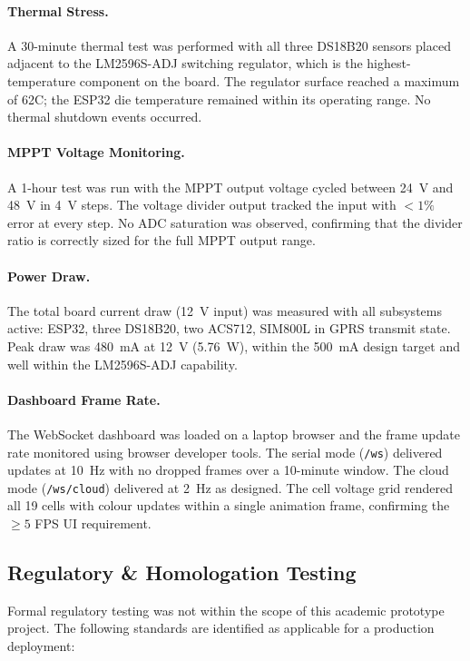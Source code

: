 \paragraph{Thermal Stress.}
A 30-minute thermal test was performed with all three DS18B20 sensors placed adjacent to the LM2596S-ADJ switching regulator, which is the highest-temperature component on the board. The regulator surface reached a maximum of 62\textdegree{}C; the ESP32 die temperature remained within its operating range. No thermal shutdown events occurred.

\paragraph{MPPT Voltage Monitoring.}
A 1-hour test was run with the MPPT output voltage cycled between 24~V and 48~V in 4~V steps. The voltage divider output tracked the input with $< 1\%$ error at every step. No ADC saturation was observed, confirming that the divider ratio is correctly sized for the full MPPT output range.

\paragraph{Power Draw.}
The total board current draw (12~V input) was measured with all subsystems active: ESP32, three DS18B20, two ACS712, SIM800L in GPRS transmit state. Peak draw was 480~mA at 12~V (5.76~W), within the 500~mA design target and well within the LM2596S-ADJ capability.

\paragraph{Dashboard Frame Rate.}
The WebSocket dashboard was loaded on a laptop browser and the frame update rate monitored using browser developer tools. The serial mode (\texttt{/ws}) delivered updates at 10~Hz with no dropped frames over a 10-minute window. The cloud mode (\texttt{/ws/cloud}) delivered at 2~Hz as designed. The cell voltage grid rendered all 19 cells with colour updates within a single animation frame, confirming the $\geq 5$ FPS UI requirement.

\subsection{Regulatory \& Homologation Testing}

Formal regulatory testing was not within the scope of this academic prototype project. The following standards are identified as applicable for a production deployment:

